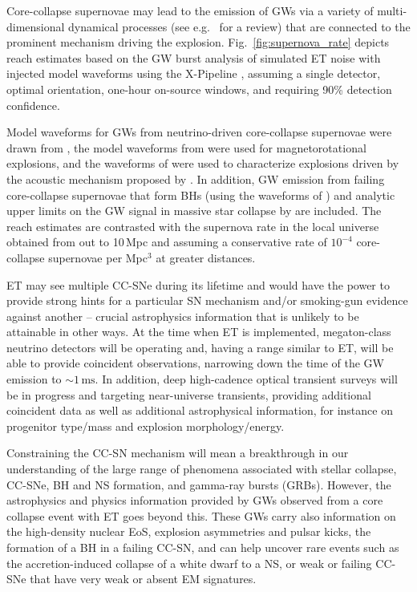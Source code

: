 Core-collapse supernovae may lead to the emission of GWs
via a variety of multi-dimensional dynamical processes (see
e.g.\ \cite{ott:09} for a review) that are connected to the
prominent mechanism driving the explosion. Fig.~\ref{fig:supernova_rate} 
depicts reach estimates based on the GW burst analysis of simulated
ET noise with injected model waveforms using the X-Pipeline
\cite{sutton:10,kalmus:11}, assuming a single detector, optimal orientation,
one-hour on-source windows, and requiring 90\% detection confidence.

Model waveforms for GWs from neutrino-driven core-collapse
supernovae were drawn from \cite{ott:09,marek:09b,murphy:09,yakunin:10},
the model waveforms from \cite{scheidegger:10b,dimmelmeier:08} were used
for magnetorotational explosions, and the waveforms of \cite{ott:09}
were used to characterize explosions driven by the acoustic mechanism
proposed by \cite{burrows:06}. In addition, GW emission
from failing core-collapse supernovae that form BHs
(using the waveforms of \cite{ott:11a}) and analytic upper limits on the
GW signal in massive star collapse by \cite{fryer:02,piro:07}
are included.
The reach estimates are contrasted with the supernova rate in the
local universe obtained from \cite{ando:05} out to 10\,Mpc and assuming
a conservative rate of $10^{-4}$ core-collapse supernovae per Mpc$^3$
\cite{strigari:05} at greater distances.

ET may see multiple CC-SNe during its lifetime 
and would have the power to provide strong hints for a particular SN mechanism 
and/or smoking-gun evidence against another -- crucial astrophysics
information that is unlikely to be attainable in other ways.  At the time when 
ET is implemented, megaton-class neutrino detectors will be operating
and, having a range similar to ET, will be able to provide coincident
observations, narrowing down the time of the GW emission to $\sim
1\,\mathrm{ms}$. In addition, deep high-cadence optical transient
surveys will be in progress and targeting near-universe transients,
providing additional coincident data as well as additional astrophysical 
information, for instance on progenitor type/mass and explosion morphology/energy.

Constraining the CC-SN mechanism will mean
a breakthrough in our understanding of the large range of phenomena
associated with stellar collapse, CC-SNe, BH and NS formation, and
gamma-ray bursts (GRBs). However, the astrophysics and physics
information provided by GWs observed from a core collapse event with ET goes
beyond this. These GWs carry also information on the high-density nuclear EoS,
explosion asymmetries and pulsar kicks, the formation of a BH in a
failing CC-SN, and can help uncover rare events such as
the accretion-induced collapse of a white dwarf to a NS, or weak or failing
CC-SNe that have very weak or absent EM signatures.


